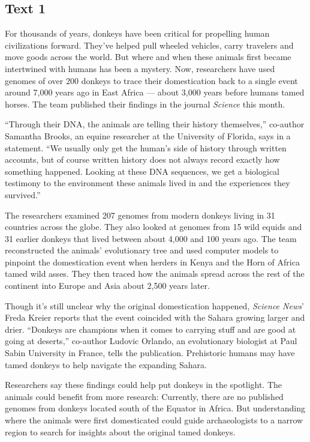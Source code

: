 \documentclass[UTF8,11pt]{ctexart}
\begin{document}
\subsection*{\textbf{Text 1}}


For thousands of years, donkeys have been critical for propelling human civilizations forward. They’ve helped pull wheeled vehicles, carry travelers and move goods across the world. But where and when these animals first became intertwined with humans has been a mystery. Now, researchers have used genomes of over 200 donkeys to trace their domestication back to a single event around 7,000 years ago in East Africa — about 3,000 years before humans tamed horses. The team published their findings in the journal \textit{Science} this month.


“Through their DNA, the animals are telling their history themselves,” co-author Samantha Brooks, an equine researcher at the University of Florida, says in a statement. “We usually only get the human’s side of history through written accounts, but of course written history does not always record exactly how something happened. Looking at these DNA sequences, we get a biological testimony to the environment these animals lived in and the experiences they survived.”


The researchers examined 207 genomes from modern donkeys living in 31 countries across the globe. They also looked at genomes from 15 wild equids and 31 earlier donkeys that lived between about 4,000 and 100 years ago. The team reconstructed the animals’ evolutionary tree and used computer models to pinpoint the domestication event when herders in Kenya and the Horn of Africa tamed wild asses. They then traced how the animals spread across the rest of the continent into Europe and Asia about 2,500 years later.


Though it’s still unclear why the original domestication happened, \textit{Science News}’ Freda Kreier reports that the event coincided with the Sahara growing larger and drier. “Donkeys are champions when it comes to carrying stuff and are good at going at deserts,” co-author Ludovic Orlando, an evolutionary biologist at Paul Sabin University in France, tells the publication. Prehistoric humans may have tamed donkeys to help navigate the expanding Sahara.


Researchers say these findings could help put donkeys in the spotlight. The animals could benefit from more research: Currently, there are no published genomes from donkeys located south of the Equator in Africa. But understanding where the animals were first domesticated could guide archaeologists to a narrow region to search for insights about the original tamed donkeys.
\end{document}

